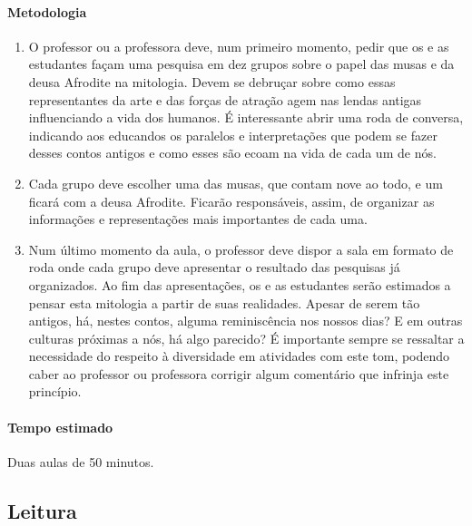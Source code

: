 \documentclass[12pt]{extarticle}
\begin{document}
\paragraph{Metodologia}

\begin{enumerate}

  \item
  O professor ou a professora deve, num primeiro momento, pedir que os e as estudantes façam
  uma pesquisa em dez grupos sobre o papel das musas e da deusa Afrodite na mitologia. 
  Devem se debruçar sobre como essas representantes da arte e das forças de atração agem nas lendas antigas 
  influenciando a vida dos humanos. É interessante abrir uma roda de conversa, 
  indicando aos educandos os paralelos e interpretações que podem se fazer desses 
  contos antigos e como esses são ecoam na vida de cada um de nós.

  \item
  Cada grupo deve escolher uma das musas, que contam nove ao todo, e um ficará com a deusa
  Afrodite. Ficarão responsáveis, assim, de organizar as informações e representações
  mais importantes de cada uma. 

  \item
  Num último momento da aula, o professor deve dispor a sala em formato de 
  roda onde cada grupo deve apresentar o resultado das pesquisas já 
  organizados. Ao fim das apresentações, os e as estudantes serão estimados
  a pensar esta mitologia a partir de suas realidades. Apesar de serem tão antigos,
  há, nestes contos, alguma reminiscência nos nossos dias? E em outras culturas
  próximas a nós, há algo parecido? É importante sempre se ressaltar
  a necessidade do respeito à diversidade em atividades com este tom, podendo
  caber ao professor ou professora corrigir algum comentário que infrinja
  este princípio.

\end{enumerate}

\paragraph{Tempo estimado} Duas aulas de 50 minutos.

 
\subsection{Leitura}
\end{document}

